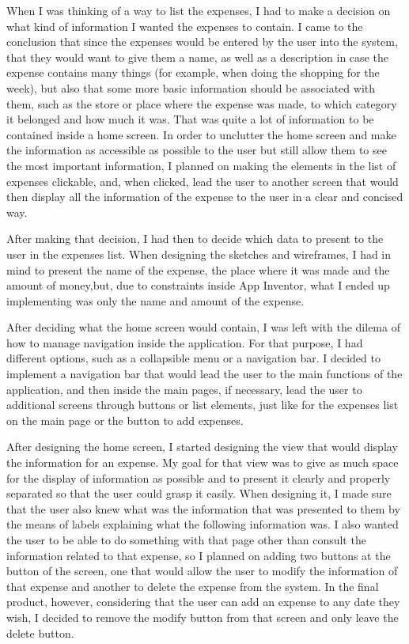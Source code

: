 When I was thinking of a way to list the expenses, I had to make a decision on what kind of information I wanted the expenses to contain. I came to the conclusion that since the expenses would be entered by the user into the system, that they would want to give them a name, as well as a description in case the expense contains many things (for example, when doing the shopping for the week), but also that some more basic information should be associated with them, such as the store or place where the expense was made, to which category it belonged and how much it was. That was quite a lot of information to be contained inside a home screen. In order to unclutter the home screen and make the information as accessible as possible to the user but still allow them to see the most important information, I planned on making the elements in the list of expenses clickable, and, when clicked, lead the user to another screen that would then display all the information of the expense to the user in a clear and concised way.

After making that decision, I had then to decide which data to present to the user in the expenses list. When designing the sketches and wireframes, I had in mind to present the name of the expense, the place where it was made and the amount of money,but, due to constraints inside App Inventor, what I ended up implementing was only the name and amount of the expense.

After deciding what the home screen would contain, I was left with the dilema of how to manage navigation inside the application. For that purpose, I had different options, such as a collapsible menu or a navigation bar. I decided to implement a navigation bar that would lead the user to the main functions of the application, and then inside the main pages, if necessary, lead the user to additional screens through buttons or list elements, just like for the expenses list on the main page or the button to add expenses.

After designing the home screen, I started designing the view that would display the information for an expense. My goal for that view was to give as much space for the display of information as possible and to present it clearly and properly separated so that the user could grasp it easily. When designing it, I made sure that the user also knew what was the information that was presented to them by the means of labels explaining what the following information was. I also wanted the user to be able to do something with that page other than consult the information related to that expense, so I planned on adding two buttons at the button of the screen, one that would allow the user to modify the information of that expense and another to delete the expense from the system. In the final product, however, considering that the user can add an expense to any date they wish, I decided to remove the modify button from that screen and only leave the delete button.

